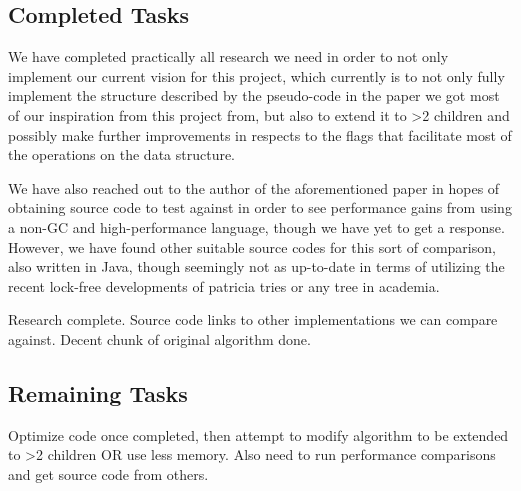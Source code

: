 \documentclass[conference]{IEEEtran}
\begin{document}
\subsection{Completed Tasks}
We have completed practically all research we need in order to not only implement our current vision for this project, which currently is to not only fully implement the structure described by the pseudo-code in the paper we got most of our inspiration from this project from\cite{Shafiei2013}, but also to extend it to >2 children and possibly make further improvements in respects to the flags that facilitate most of the operations on the data structure.
\par
We have also reached out to the author of the aforementioned paper in hopes of obtaining source code to test against in order to see performance gains from using a non-GC and high-performance language, though we have yet to get a response. However, we have found other suitable source codes for this sort of comparison, also written in Java, though seemingly not as up-to-date in terms of utilizing the recent lock-free developments of patricia tries or any tree in academia.\cite{PATSource}
\par
Research complete. Source code links to other implementations we can compare against. Decent chunk of original algorithm done. 


\subsection{Remaining Tasks}
Optimize code once completed, then attempt to modify algorithm to be extended to >2 children OR use less memory.
Also need to run performance comparisons and get source code from others.




\end{document}
